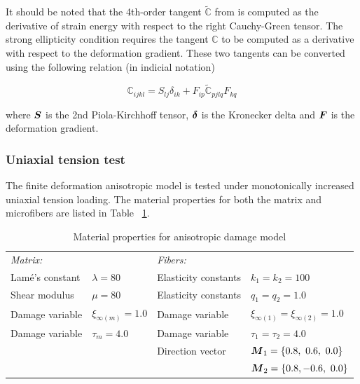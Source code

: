 \documentclass[12pt]{article}
\numberwithin{equation}{section}
\begin{document}
It should be noted that the 4th-order tangent $\tilde{\mathbb{C}}$ 
from  is computed as the derivative of strain 
energy with respect to the right Cauchy-Green tensor. The strong 
ellipticity condition  requires the 
tangent $\mathbb{C}$ to be computed as a derivative with respect to 
the deformation gradient. These two tangents can be converted using 
the following relation (in indicial notation)

\begin{equation}
  \mathbb{C}_{ijkl} = S_{lj}\delta_{ik}
    + F_{ip} \tilde{\mathbb{C}}_{pjlq} F_{kq}
\end{equation}

where ${\boldsymbol{S}}$ is the 2nd Piola-Kirchhoff tensor, ${\boldsymbol{\delta}}$ is the 
Kronecker delta and ${\boldsymbol{F}}$ is the deformation gradient.

\subsubsection{Uniaxial tension test}

The finite deformation anisotropic model is tested under monotonically
increased uniaxial tension loading. The material properties for both 
the matrix and microfibers are listed in Table~
\ref{tab:aniso_material}.

\begin{table}[H]
  \begin{center}
    \begin{tabular}{ l l l l }
      \toprule
      \it{Matrix}:
      &
      
      &
     
      \it{Fibers}:
      
      &
      \\
      Lam\'{e}'s constant
      &
      $\lambda=80$
      &
      Elasticity constants
      &
      $k_1 = k_2 = 100$
      \\
      Shear modulus
      &
      $\mu = 80$
      &
      Elasticity constants
      &
      $q_1 = q_2 = 1.0$      
      \\
      Damage variable  
      &
      $\xi_{\infty(m)} = 1.0$
      &
      Damage variable
      &
      $\xi_{\infty(1)} = \xi_{\infty(2)} = 1.0$      
      \\
      Damage variable   
      &
      $\tau_m = 4.0$
      &
      Damage variable
      &
      $\tau_1 = \tau_2 = 4.0$
      \\
      &
      
      &
      Direction vector
      &
      ${\boldsymbol{M}}_1 = \{ 0.8,~0.6,~0.0\}$
      \\
      &

      &
	       
      &
      ${\boldsymbol{M}}_2 = \{ 0.8,-0.6,~0.0\}$
      \\
      \bottomrule
    \end{tabular}
    \caption{Material properties for anisotropic damage model}
    \label{tab:aniso_material}
  \end{center}
\end{table}
\end{document}
